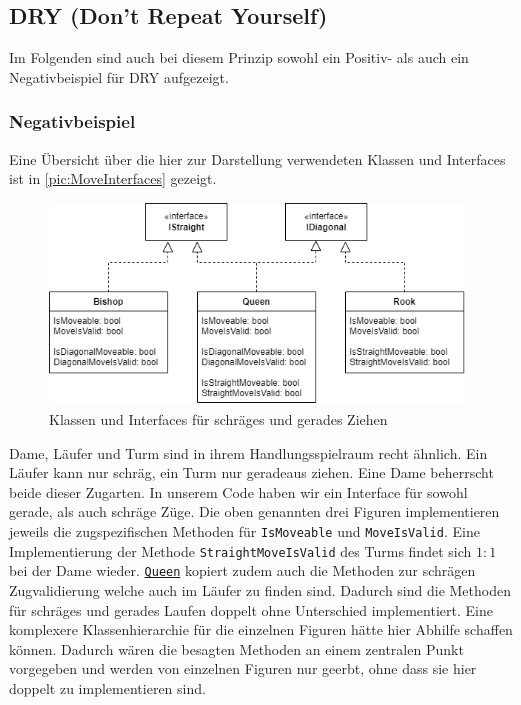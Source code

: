 \documentclass[
10pt, %
a4paper, %
oneside, %
headinclude,footinclude, %
BCOR5mm, %
]{scrartcl}
\begin{document}
\begin{onehalfspace}
\subsection{DRY (Don't Repeat Yourself)}
Im Folgenden sind auch bei diesem Prinzip sowohl ein Positiv- als auch ein Negativbeispiel für DRY aufgezeigt. 

\subsubsection{Negativbeispiel}
Eine Übersicht über die hier zur Darstellung verwendeten Klassen und Interfaces ist in \autoref{pic:MoveInterfaces} gezeigt.

\begin{figure}[h]
	\begin{center}
		\includegraphics[width=11cm]{MoveInterfaces.png}
		\caption{\label{pic:MoveInterfaces}Klassen und Interfaces für schräges und gerades Ziehen}
	\end{center}
\end{figure}

Dame, Läufer und Turm sind in ihrem Handlungsspielraum recht ähnlich. Ein Läufer kann nur schräg, ein Turm nur geradeaus ziehen. Eine Dame beherrscht beide dieser Zugarten. In unserem Code haben wir ein Interface für sowohl gerade, als auch schräge Züge. Die oben genannten drei Figuren implementieren jeweils die zugspezifischen Methoden für \texttt{IsMoveable} und \texttt{MoveIsValid}. 
Eine Implementierung der Methode \texttt{StraightMoveIsValid} des Turms findet sich $1:1$ bei der Dame wieder. \texttt{\href{https://github.com/schmida736/Chess-AdvancedSE/blob/main/Chess-AdvancedSE/Game\%20Elements/Pieces/Queen.cs}{Queen}} kopiert zudem auch die Methoden zur schrägen Zugvalidierung welche auch im Läufer zu finden sind. Dadurch sind die Methoden für schräges und gerades Laufen doppelt ohne Unterschied implementiert. Eine komplexere Klassenhierarchie für die einzelnen Figuren hätte hier Abhilfe schaffen können. Dadurch wären die besagten Methoden an einem zentralen Punkt vorgegeben und werden von einzelnen Figuren nur geerbt, ohne dass sie hier doppelt zu implementieren sind.


\end{onehalfspace}
\end{document}
